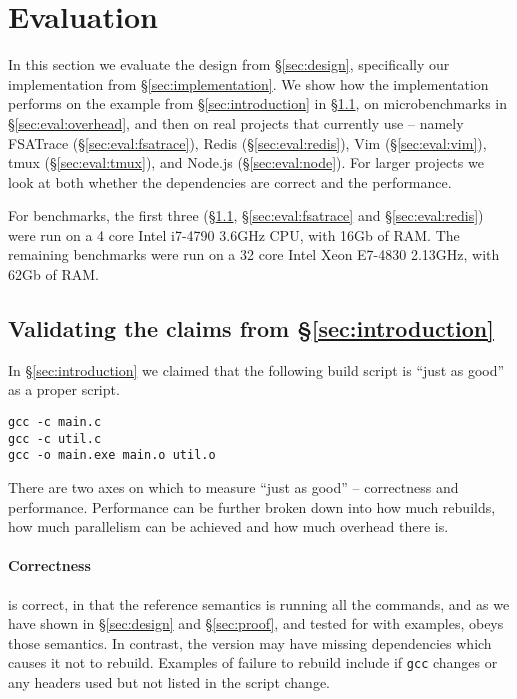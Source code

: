 \section{Evaluation}
\label{sec:evaluation}

In this section we evaluate the design from \S\ref{sec:design}, specifically our implementation from \S\ref{sec:implementation}. We show how the implementation performs on the example from \S\ref{sec:introduction} in \S\ref{sec:eval:introduction}, on microbenchmarks in \S\ref{sec:eval:overhead}, and then on real projects that currently use \Make{} -- namely FSATrace (\S\ref{sec:eval:fsatrace}), Redis (\S\ref{sec:eval:redis}), Vim (\S\ref{sec:eval:vim}), tmux (\S\ref{sec:eval:tmux}), and Node.js (\S\ref{sec:eval:node}). For larger projects we look at both whether the dependencies are correct and the performance.

For benchmarks, the first three (\S\ref{sec:eval:introduction}, \S\ref{sec:eval:fsatrace} and \S\ref{sec:eval:redis}) were run on a 4 core Intel i7-4790 3.6GHz CPU, with 16Gb of RAM. The remaining benchmarks were run on a 32 core Intel Xeon E7-4830 2.13GHz, with 62Gb of RAM.

\subsection{Validating the claims from \S\ref{sec:introduction}}
\label{sec:eval:introduction}

In \S\ref{sec:introduction} we claimed that the following build script is ``just as good'' as a proper \Make script.

\begin{verbatim}
gcc -c main.c
gcc -c util.c
gcc -o main.exe main.o util.o
\end{verbatim}

There are two axes on which to measure ``just as good'' -- correctness and performance. Performance can be further broken down into how much rebuilds, how much parallelism can be achieved and how much overhead there is.

\paragraph{Correctness} \Rattle is correct, in that the reference semantics is running all the commands, and as we have shown in \S\ref{sec:design} and \S\ref{sec:proof}, and tested for with examples, \Rattle obeys those semantics. In contrast, the \Make version may have missing dependencies which causes it not to rebuild. Examples of failure to rebuild include if \texttt{gcc} changes or any headers used but not listed in the \Make script change.

